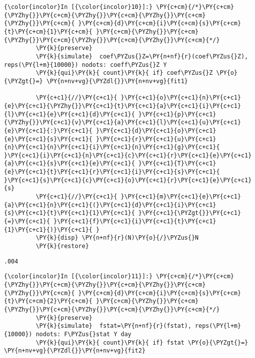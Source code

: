 \documentclass[11pt,notitlepage]{article}\usepackage[]{graphicx}\usepackage[]{color}
\makeatletter
\newenvironment{kframe}{%
 \def\at@end@of@kframe{}%
 \ifinner\ifhmode%
  \def\at@end@of@kframe{\end{minipage}}%
  \begin{minipage}{\columnwidth}%
 \fi\fi%
 \def\FrameCommand##1{\hskip\@totalleftmargin \hskip-\fboxsep
 \colorbox{shadecolor}{##1}\hskip-\fboxsep
     \hskip-\linewidth \hskip-\@totalleftmargin \hskip\columnwidth}%
 \MakeFramed {\advance\hsize-\width
   \@totalleftmargin\z@ \linewidth\hsize
   \@setminipage}}%
 {\par\unskip\endMakeFramed%
 \at@end@of@kframe}
\newenvironment{knitrout}{}{} %
\makeatother
\begin{document}
\begin{enumerate}[a)]
\begin{knitrout}
\begin{kframe}
    \begin{Verbatim}[commandchars=\\\{\}]
{\color{incolor}In [{\color{incolor}10}]:} \PY{c+cm}{/*}\PY{c+cm}{\PYZhy{}}\PY{c+cm}{\PYZhy{}}\PY{c+cm}{\PYZhy{}}\PY{c+cm}{\PYZhy{}}\PY{c+cm}{ }\PY{c+cm}{d}\PY{c+cm}{i}\PY{c+cm}{s}\PY{c+cm}{t}\PY{c+cm}{1}\PY{c+cm}{ }\PY{c+cm}{\PYZhy{}}\PY{c+cm}{\PYZhy{}}\PY{c+cm}{\PYZhy{}}\PY{c+cm}{\PYZhy{}}\PY{c+cm}{*/}
         \PY{k}{preserve}	
         \PY{k}{simulate}  coef\PYZus{}Z=\PY{n+nf}{r}(coef\PYZus{}Z), reps(\PY{l+m}{10000}) nodots: coeff\PYZus{}Z Y	
         \PY{k}{qui}\PY{k}{ count}\PY{k}{ if} coef\PYZus{}Z \PY{o}{\PYZgt{}=} \PY{n+nv+vg}{\PYZdl{}}\PY{n+nv+vg}{fit1}
         
         \PY{c+c1}{//}\PY{c+c1}{ }\PY{c+c1}{o}\PY{c+c1}{n}\PY{c+c1}{e}\PY{c+c1}{\PYZhy{}}\PY{c+c1}{t}\PY{c+c1}{a}\PY{c+c1}{i}\PY{c+c1}{l}\PY{c+c1}{e}\PY{c+c1}{d}\PY{c+c1}{ }\PY{c+c1}{p}\PY{c+c1}{\PYZhy{}}\PY{c+c1}{v}\PY{c+c1}{a}\PY{c+c1}{l}\PY{c+c1}{u}\PY{c+c1}{e}\PY{c+c1}{:}\PY{c+c1}{ }\PY{c+c1}{d}\PY{c+c1}{o}\PY{c+c1}{e}\PY{c+c1}{s}\PY{c+c1}{ }\PY{c+c1}{r}\PY{c+c1}{u}\PY{c+c1}{n}\PY{c+c1}{n}\PY{c+c1}{i}\PY{c+c1}{n}\PY{c+c1}{g}\PY{c+c1}{ }\PY{c+c1}{i}\PY{c+c1}{n}\PY{c+c1}{c}\PY{c+c1}{r}\PY{c+c1}{e}\PY{c+c1}{a}\PY{c+c1}{s}\PY{c+c1}{e}\PY{c+c1}{ }\PY{c+c1}{T}\PY{c+c1}{e}\PY{c+c1}{t}\PY{c+c1}{r}\PY{c+c1}{i}\PY{c+c1}{s}\PY{c+c1}{ }\PY{c+c1}{s}\PY{c+c1}{c}\PY{c+c1}{o}\PY{c+c1}{r}\PY{c+c1}{e}\PY{c+c1}{s}
         \PY{c+c1}{//}\PY{c+c1}{ }\PY{c+c1}{m}\PY{c+c1}{e}\PY{c+c1}{a}\PY{c+c1}{n}\PY{c+c1}{(}\PY{c+c1}{d}\PY{c+c1}{i}\PY{c+c1}{s}\PY{c+c1}{t}\PY{c+c1}{1}\PY{c+c1}{ }\PY{c+c1}{\PYZgt{}}\PY{c+c1}{=}\PY{c+c1}{ }\PY{c+c1}{f}\PY{c+c1}{i}\PY{c+c1}{t}\PY{c+c1}{1}\PY{c+c1}{)}\PY{c+c1}{ }
         \PY{k}{disp} \PY{n+nf}{r}(N)\PY{o}{/}\PYZus{}N
         \PY{k}{restore}
\end{Verbatim}

    \begin{Verbatim}[commandchars=\\\{\}]
.004
    \end{Verbatim}

    \begin{Verbatim}[commandchars=\\\{\}]
{\color{incolor}In [{\color{incolor}11}]:} \PY{c+cm}{/*}\PY{c+cm}{\PYZhy{}}\PY{c+cm}{\PYZhy{}}\PY{c+cm}{\PYZhy{}}\PY{c+cm}{\PYZhy{}}\PY{c+cm}{ }\PY{c+cm}{d}\PY{c+cm}{i}\PY{c+cm}{s}\PY{c+cm}{t}\PY{c+cm}{2}\PY{c+cm}{ }\PY{c+cm}{\PYZhy{}}\PY{c+cm}{\PYZhy{}}\PY{c+cm}{\PYZhy{}}\PY{c+cm}{\PYZhy{}}\PY{c+cm}{*/}
         \PY{k}{preserve}	
         \PY{k}{simulate}  fstat=\PY{n+nf}{r}(fstat), reps(\PY{l+m}{10000}) nodots: F\PYZus{}stat Y day
         \PY{k}{qui}\PY{k}{ count}\PY{k}{ if} fstat \PY{o}{\PYZgt{}=} \PY{n+nv+vg}{\PYZdl{}}\PY{n+nv+vg}{fit2}
         

\end{Verbatim}
\end{kframe}
\end{knitrout}
\end{enumerate}
\end{document}
